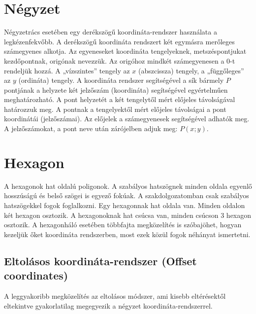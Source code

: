 
\section{Négyzet}

Négyzetrács esetében egy derékszögű koordináta-rendszer használata a legkézenfekvőbb. 
\newline
\newline A derékszögű koordináta rendszert két egymásra merőleges számegyenes alkotja. Az egyeneseket koordináta tengelyeknek, metszéspontjukat kezdőpontnak, origónak nevezzük. Az origóhoz mindkét számegyenesen a $0$-t rendeljük hozzá. A „vízszintes” tengely az $x$ (abszcissza) tengely, a „függőleges” az $y$ (ordináta) tengely.
\newline
\newline A koordináta rendszer segítségével a sík bármely $P$ pontjának a helyzete két jelzőszám (koordináta) segítségével egyértelműen meghatározható. A pont helyzetét a két tengelytől mért előjeles távolságával határozzuk meg. A pontnak a tengelyektől mért előjeles távolságai a pont koordinátái (jelzőszámai). Az előjelek a számegyenesek segítségével adhatók meg. A jelzőszámokat, a pont neve után zárójelben adjuk meg: $P(x;y)$.

\section{Hexagon}

A hexagonok hat oldalú poligonok. A szabályos hatszögnek minden oldala egyenlő hosszúságú és belső szögei is egyező fokúak. A szakdolgozatomban csak szabályos hatszögekkel fogok foglalkozni. 
\newline
\newline Egy hexagonnak hat oldala van. Minden oldalon két hexagon osztozik. A hexagonoknak hat csúcsa van, minden csúcson 3 hexagon osztozik.
\newline
\newline A hexagonháló esetében többfajta megközelítés is szóbajöhet, hogyan kezeljük őket koordináta rendszerben, most ezek közül fogok néhányat ismertetni. 

\subsection{Eltolásos koordináta-rendszer (Offset coordinates)}

A leggyakoribb megközelítés az eltolásos módszer, ami kisebb eltérésektől eltekintve gyakorlatilag megegyezik a négyzet koordináta-rendszerrel. 
\newline
\newline\newline

